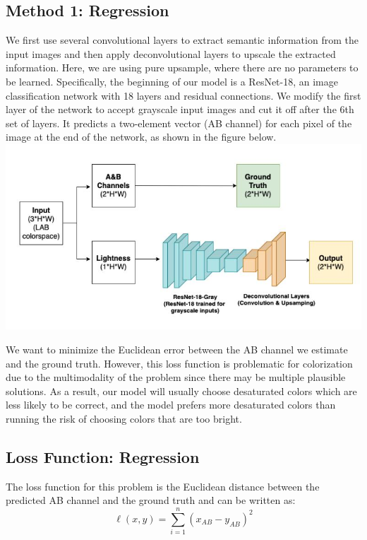 \documentclass{article}
\begin{document}
\subsection{Method 1: Regression}
We first use several convolutional layers to extract semantic information from the input images and then apply deconvolutional layers to upscale the extracted information.
Here, we are using pure upsample, where there are no parameters to be learned.
Specifically, the beginning of our model is a ResNet-18, an image classification network with 18 layers and residual connections. 
We modify the first layer of the network to accept grayscale input images and cut it off after the 6th set of layers. 
It predicts a two-element vector (AB channel) for each pixel of the image at the end of the network, as shown in the figure below.
\\
\includegraphics[width=\linewidth]{reg.jpg}

We want to minimize the Euclidean error between the AB channel we estimate and the ground truth.
However, this loss function is problematic for colorization due to the multimodality of the problem since there may be multiple plausible solutions.
As a result, our model will usually choose desaturated colors which are less likely to be correct, and the model prefers more desaturated colors than running the risk of choosing colors that are too bright.


\subsection{Loss Function: Regression}
The loss function for this problem is the Euclidean distance between the predicted AB channel and the ground truth and can be written as:
{\Large
\begin{equation}
    \ell(x,y) = \sum_{i=1}^{n} \left( x_{AB} - y_{AB} \right)^2
\end{equation}}
\end{document}
